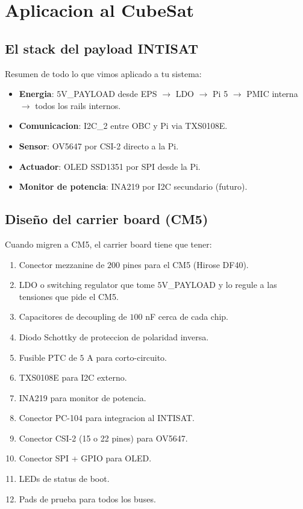 \documentclass[11pt,a4paper,oneside,openright]{book}
\begin{document}
\part{Aplicacion al CubeSat}

\chapter{El stack del payload INTISAT}

Resumen de todo lo que vimos aplicado a tu sistema:

\begin{itemize}[leftmargin=2em]
  \item \textbf{Energia}: $5$V\_PAYLOAD desde EPS $\to$ LDO $\to$ Pi 5 $\to$ PMIC interna $\to$ todos los rails internos.
  \item \textbf{Comunicacion}: I2C\_2 entre OBC y Pi via TXS0108E.
  \item \textbf{Sensor}: OV5647 por CSI-2 directo a la Pi.
  \item \textbf{Actuador}: OLED SSD1351 por SPI desde la Pi.
  \item \textbf{Monitor de potencia}: INA219 por I2C secundario (futuro).
\end{itemize}

\chapter{Diseño del carrier board (CM5)}

Cuando migren a CM5, el carrier board tiene que tener:

\begin{enumerate}[leftmargin=2em]
  \item Conector mezzanine de $200$ pines para el CM5 (Hirose DF40).
  \item LDO o switching regulator que tome $5$V\_PAYLOAD y lo regule a
        las tensiones que pide el CM5.
  \item Capacitores de decoupling de $100$ nF cerca de cada chip.
  \item Diodo Schottky de proteccion de polaridad inversa.
  \item Fusible PTC de $5$ A para corto-circuito.
  \item TXS0108E para I2C externo.
  \item INA219 para monitor de potencia.
  \item Conector PC-104 para integracion al INTISAT.
  \item Conector CSI-2 (15 o 22 pines) para OV5647.
  \item Conector SPI + GPIO para OLED.
  \item LEDs de status de boot.
  \item Pads de prueba para todos los buses.
\end{enumerate}
\end{document}

